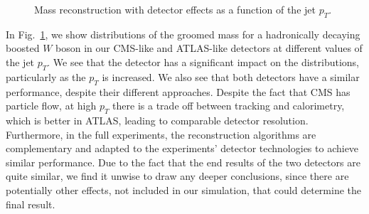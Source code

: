 \documentclass[11pt]{cernrep}
\begin{document}
\begin{figure}
  \caption{Mass reconstruction with detector effects as a function of the jet $p_T$.}
  \label{jetsub_2prong_fig:mass-detector}
\end{figure}

In Fig.~\ref{jetsub_2prong_fig:mass-detector}, we show distributions of the groomed mass for a hadronically decaying boosted $W$ boson in our CMS-like and ATLAS-like detectors at different values of the jet $p_T$.
%
We see that the detector has a significant impact on the distributions, particularly as the $p_T$ is increased.
%
We also see that both detectors have a similar performance, despite their different approaches.
%
Despite the fact that CMS has particle flow, at high $p_T$ there is a trade off between tracking and calorimetry, which is better in ATLAS, leading to comparable detector resolution.
%
Furthermore, in the full experiments, the reconstruction algorithms are complementary and adapted to the experiments' detector technologies to achieve similar performance.
%
Due to the fact that the end results of the two detectors are quite similar, we find it unwise to draw any deeper conclusions, since there are potentially other effects, not included in our simulation, that could determine the final result.
\end{document}
